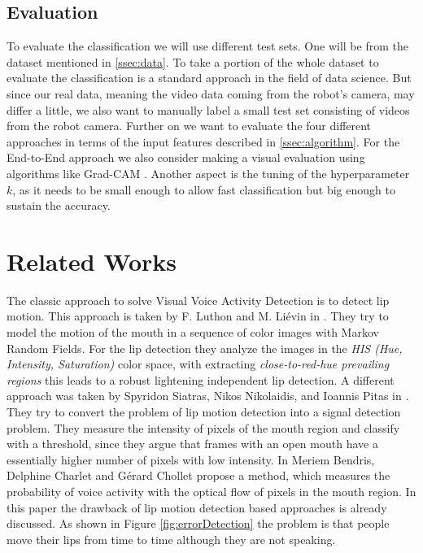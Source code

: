 \subsection{Evaluation}\label{ssec:evaluation}
To evaluate the classification we will use different test sets. One will be from the dataset mentioned in \ref{ssec:data}. To take a portion of the whole dataset to evaluate the classification is a standard approach in the field of data science. But since our real data, meaning the video data coming from the robot's camera, may differ a little, we also want to manually label a small test set consisting of videos from the robot camera.
Further on we want to evaluate the four different approaches in terms of the input features described in \ref{ssec:algorithm}. For the End-to-End approach we also consider making a visual evaluation using algorithms like Grad-CAM \cite{SelvarajuDVCPB16}.
Another aspect is the tuning of the hyperparameter $k$, as it needs to be small enough to allow fast classification but big enough to sustain the accuracy.

\section{Related Works}\label{sec:relatedWorks}
The classic approach to solve Visual Voice Activity Detection is to detect lip motion.
This approach is taken by F. Luthon and  M. Liévin in \citep{Luthon1998}. They try to model the motion of the mouth in a sequence of color images with Markov Random Fields. For the lip detection they analyze the images in the \emph{HIS (Hue,
Intensity, Saturation)} color space, with extracting \emph{close-to-red-hue prevailing regions} this leads to a robust lightening independent lip detection.
A different approach was taken by Spyridon Siatras, Nikos Nikolaidis, and Ioannis Pitas in \cite{Siatras2006}. They try to convert the problem of lip motion detection into a signal detection problem. They measure the intensity of pixels of the mouth region and classify with a threshold, since they argue that frames with an open mouth have a essentially higher number of pixels with low intensity.
In \citep{Bendris2010} Meriem Bendris, Delphine Charlet and Gérard Chollet propose a method,
which measures the probability of voice activity with the optical flow of pixels in the mouth region. In this paper the drawback of lip motion detection based approaches is already discussed.
As shown in Figure \ref{fig:errorDetection} the problem is that people move their lips from time to time although they are not speaking.

